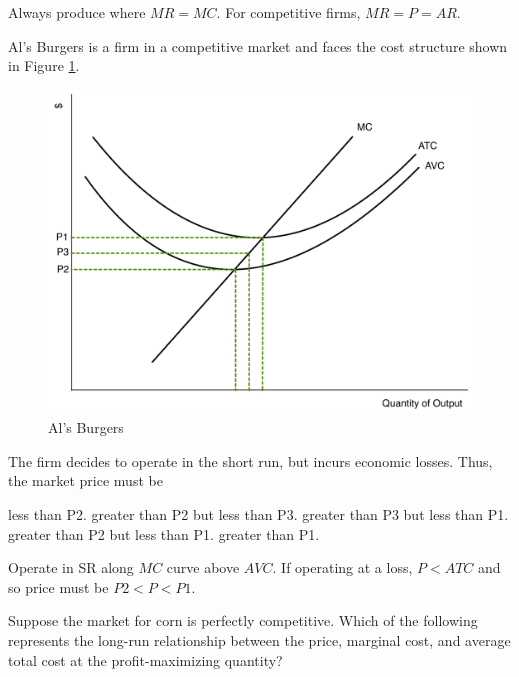 \documentclass[addpoints,11pt]{exam}
\theoremstyle{definition}
\begin{document}
\begin{questions}
	\begin{solution}
		Always produce where $MR = MC$. For competitive firms, $MR = P = AR$.
	\end{solution}
	
\newpage

	\question Al's Burgers is a firm in a competitive market and faces the cost structure shown in Figure \ref{MC28}.
				
				\begin{figure}[htp]
					\centering
					\includegraphics[scale=.45]{Exam1_MC27.pdf}
					\caption{Al's Burgers}
					\label{MC28}
				\end{figure}
				
				The firm decides to operate in the short run, but incurs economic losses. Thus, the market price must be 
				
				\begin{choices}
					\choice less than P2.
					\choice greater than P2 but less than P3.
					\choice greater than P3 but less than P1.
					\CorrectChoice greater than P2 but less than P1.
					\choice greater than P1.
				\end{choices}
				
			\begin{solution}
				Operate in SR along $MC$ curve above $AVC$. If operating at a loss, $P<ATC$ and so price must be $P2 < P < P1$.
			\end{solution}
				
				
	\question Suppose the market for corn is perfectly competitive. Which of the following represents the long-run relationship between the price, marginal cost, and average total cost at the profit-maximizing quantity?
	

\end{questions}
\end{document}
